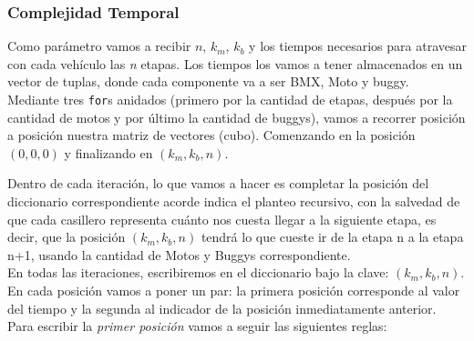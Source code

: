 \subsubsection{Complejidad Temporal}

Como par\'ametro vamos a recibir $n$, $k_m$, $k_b$ y los tiempos necesarios para atravesar con cada veh\'iculo las \emph{n} etapas. Los tiempos los vamos a tener almacenados en un vector de tuplas, donde cada componente va a ser BMX, Moto y buggy.\\

Mediante tres \texttt{for}s anidados (primero por la cantidad de etapas, despu\'es por la cantidad de motos y por \'ultimo la cantidad de buggys), vamos a recorrer posici\'on a posici\'on nuestra matriz de vectores (cubo). Comenzando en la posici\'on $(0,0,0)$ y finalizando en  $(k_{m},k_{b},n)$.

Dentro de cada iteraci\'on, lo que vamos a hacer es completar la posici\'on del diccionario correspondiente acorde indica el planteo recursivo, con la salvedad de que cada casillero representa cu\'anto nos cuesta llegar a la siguiente etapa, es decir, que la posici\'on $(k_{m},k_{b},n)$ tendr\'a lo que cueste ir de la etapa n a la etapa n+1, usando la cantidad de Motos y Buggys correspondiente.\\


En todas las iteraciones, escribiremos en el diccionario bajo la clave:  $(k{_m}, k{_b}, n)$. En cada posici\'on vamos a poner un par: la primera posici\'on corresponde al valor del tiempo y la segunda al indicador de la posici\'on inmediatamente anterior.\\

Para escribir la \emph{primer posici\'on} vamos a seguir las siguientes reglas:

